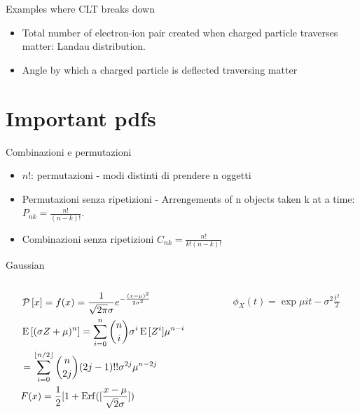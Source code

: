 \documentclass[asd-beamer.tex]{subfiles}
\begin{document}
\begin{frame}{Examples where CLT breaks down}
\begin{itemize}
\item Total number of electron-ion pair created when charged particle traverses matter: Landau distribution.
\item Angle by which a charged particle is deflected traversing matter
\end{itemize}
\end{frame}

\section{Important pdfs}

\begin{wordonframe}{Combinazioni e permutazioni}
\begin{itemize}
\item $n!$: permutazioni - modi distinti di prendere n oggetti
\item Permutazioni senza ripetizioni - Arrengements of n objects taken k at a time: $P_{nk}=\frac{n!}{(n-k)!}$.
\item Combinazioni senza ripetizioni $C_{nk}=\frac{n!}{k!(n-k)!}$
\end{itemize}
\end{wordonframe}

\begin{frame}{Gaussian}
\begin{columns}[T]
\begin{column}{0.5\textwidth}
\begin{align*}
&\operatorname{\mathcal{P}}{[x]}=f(x)=\frac{1}{\sqrt{2\pi}\sigma}e^{-\frac{(x-\mu)^2}{2\sigma^2}}\\
&\operatorname{E}{[(\sigma Z+\mu)^n]}=\sum_{i=0}^n\binom{n}{i}\sigma^i\operatorname{E}{[Z^i]}\mu^{n-i}\\
&=\sum_{i=0}^{\lfloor n/2\rfloor}\binom{n}{2j}(2j-1)!!\sigma^{2j}\mu^{n-2j}\\
&F(x)=\frac{1}{2}[1+\operatorname{Erf}([\frac{x-\mu}{\sqrt{2}\sigma}])
\end{align*}
\end{column}
\begin{column}{0.5\textwidth}
\begin{align*}
\phi_X(t)=\exp{\mu it-\sigma^2\frac{t^2}{2}}
\end{align*}
\end{column}
\end{columns}
\end{frame}
\end{document}
